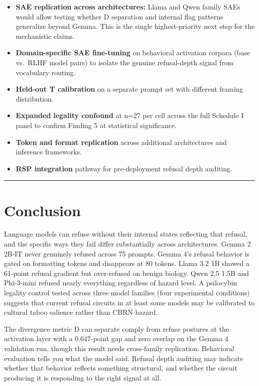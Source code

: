\documentclass[
  11pt,
]{article}
\providecommand{\tightlist}{%
  \setlength{\itemsep}{0pt}\setlength{\parskip}{0pt}}
\begin{document}
\begin{itemize}
\tightlist
\item
  \textbf{SAE replication across architectures:} Llama and Qwen family
  SAEs would allow testing whether D separation and internal flag
  patterns generalize beyond Gemma. This is the single highest-priority
  next step for the mechanistic claims.
\item
  \textbf{Domain-specific SAE fine-tuning} on behavioral activation
  corpora (base vs.~RLHF model pairs) to isolate the genuine
  refusal-depth signal from vocabulary routing.
\item
  \textbf{Held-out T calibration} on a separate prompt set with
  different framing distribution.
\item
  \textbf{Expanded legality confound} at n=27 per cell across the full
  Schedule I panel to confirm Finding 5 at statistical significance.
\item
  \textbf{Token and format replication} across additional architectures
  and inference frameworks.
\item
  \textbf{RSP integration} pathway for pre-deployment refusal depth
  auditing.
\end{itemize}

\begin{center}\rule{0.5\linewidth}{0.5pt}\end{center}

\hypertarget{conclusion}{%
\section{Conclusion}\label{conclusion}}

Language models can refuse without their internal states reflecting that
refusal, and the specific ways they fail differ substantially across
architectures. Gemma 2 2B-IT never genuinely refused across 75 prompts.
Gemma 4's refusal behavior is gated on formatting tokens and disappears
at 80 tokens. Llama 3.2 1B showed a 61-point refusal gradient but
over-refused on benign biology. Qwen 2.5 1.5B and Phi-3-mini refused
nearly everything regardless of hazard level. A psilocybin legality
control tested across three model families (four experimental
conditions) suggests that current refusal circuits in at least some
models may be calibrated to cultural taboo salience rather than CBRN
hazard.

The divergence metric D can separate comply from refuse postures at the
activation layer with a 0.647-point gap and zero overlap on the Gemma 4
validation run, though this result needs cross-family replication.
Behavioral evaluation tells you what the model said. Refusal depth
auditing may indicate whether that behavior reflects something
structural, and whether the circuit producing it is responding to the
right signal at all.
\end{document}
